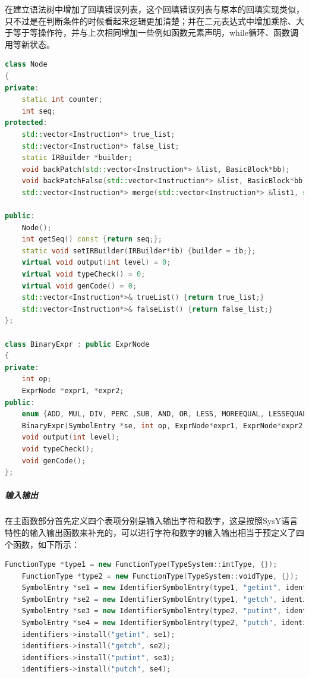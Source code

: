 \documentclass[UTF8,a4paper,10pt]{ctexart}
\begin{document}
在建立语法树中增加了回填错误列表，这个回填错误列表与原本的回填实现类似，只不过是在判断条件的时候看起来逻辑更加清楚；并在二元表达式中增加乘除、大于等于等操作符，并与上次相同增加一些例如函数元素声明，while循环、函数调用等新状态。
\begin{lstlisting}[title = 语法树补充, language = c++]
class Node
{
private:
    static int counter;
    int seq;
protected:
    std::vector<Instruction*> true_list;
    std::vector<Instruction*> false_list;
    static IRBuilder *builder;
    void backPatch(std::vector<Instruction*> &list, BasicBlock*bb);
    void backPatchFalse(std::vector<Instruction*> &list, BasicBlock*bb);
    std::vector<Instruction*> merge(std::vector<Instruction*> &list1, std::vector<Instruction*> &list2);

public:
    Node();
    int getSeq() const {return seq;};
    static void setIRBuilder(IRBuilder*ib) {builder = ib;};
    virtual void output(int level) = 0;
    virtual void typeCheck() = 0;
    virtual void genCode() = 0;
    std::vector<Instruction*>& trueList() {return true_list;}
    std::vector<Instruction*>& falseList() {return false_list;}
};

class BinaryExpr : public ExprNode
{
private:
    int op;
    ExprNode *expr1, *expr2;
public:
    enum {ADD, MUL, DIV, PERC ,SUB, AND, OR, LESS, MOREEQUAL, LESSEQUAL, EQUAL, NOEQUAL, MORE};
    BinaryExpr(SymbolEntry *se, int op, ExprNode*expr1, ExprNode*expr2) : ExprNode(se), op(op), expr1(expr1), expr2(expr2){dst = new Operand(se);};
    void output(int level);
    void typeCheck();
    void genCode();
};
\end{lstlisting}
\subparagraph{输入输出}
在主函数部分首先定义四个表项分别是输入输出字符和数字，这是按照SysY语言特性的输入输出函数来补充的，可以进行字符和数字的输入输出相当于预定义了四个函数，如下所示：
\begin{lstlisting}[title = 输入输出, language = c++]
    FunctionType *type1 = new FunctionType(TypeSystem::intType, {});
    FunctionType *type2 = new FunctionType(TypeSystem::voidType, {});
    SymbolEntry *se1 = new IdentifierSymbolEntry(type1, "getint", identifiers->getLevel());
    SymbolEntry *se2 = new IdentifierSymbolEntry(type1, "getch", identifiers->getLevel());
    SymbolEntry *se3 = new IdentifierSymbolEntry(type2, "putint", identifiers->getLevel());
    SymbolEntry *se4 = new IdentifierSymbolEntry(type2, "putch", identifiers->getLevel());
    identifiers->install("getint", se1);
    identifiers->install("getch", se2);
    identifiers->install("putint", se3);
    identifiers->install("putch", se4);
\end{lstlisting}
\end{document}
